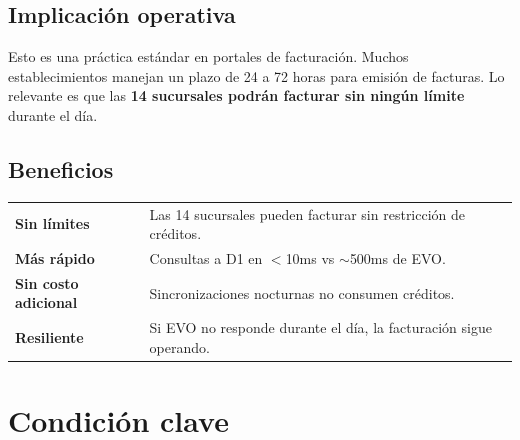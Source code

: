 \documentclass[11pt,a4paper]{article}
\begin{document}
\subsection*{Implicación operativa}

\begin{center}
\end{center}

\vspace{0.3cm}

Esto es una práctica estándar en portales de facturación. Muchos establecimientos manejan un plazo de 24 a 72 horas para emisión de facturas. Lo relevante es que las \textbf{14 sucursales podrán facturar sin ningún límite} durante el día.

\subsection*{Beneficios}

\begin{tabularx}{\textwidth}{lX}
  \textbf{Sin límites} & Las 14 sucursales pueden facturar sin restricción de créditos. \\[0.4em]
  \textbf{Más rápido} & Consultas a D1 en $<$10ms vs $\sim$500ms de EVO. \\[0.4em]
  \textbf{Sin costo adicional} & Sincronizaciones nocturnas no consumen créditos. \\[0.4em]
  \textbf{Resiliente} & Si EVO no responde durante el día, la facturación sigue operando. \\
\end{tabularx}

\newpage

\section*{Condición clave}
\end{document}
